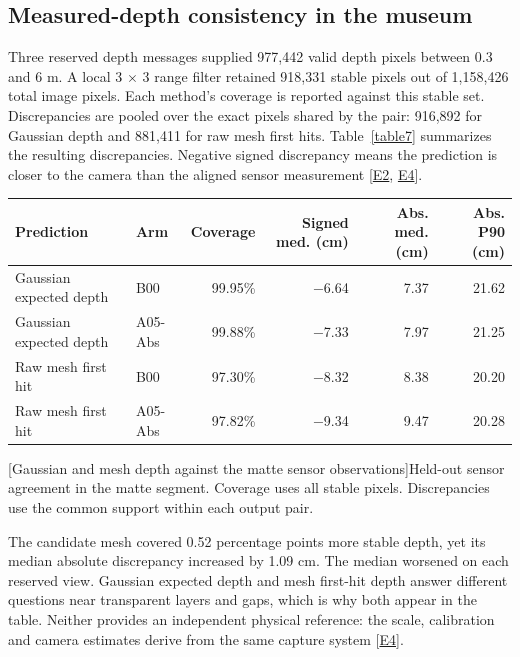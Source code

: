 \documentclass[11pt,a4paper]{article}
\begin{document}
\subsection{Measured-depth consistency in the museum}
Three reserved depth messages supplied 977,442 valid depth pixels between 0.3 and 6 m. A local 3 \ensuremath{\times} 3 range filter retained 918,331 stable pixels out of 1,158,426 total image pixels. Each method's coverage is reported against this stable set. Discrepancies are pooled over the exact pixels shared by the pair: 916,892 for Gaussian depth and 881,411 for raw mesh first hits. Table~\ref{table7} summarizes the resulting discrepancies. Negative signed discrepancy means the prediction is closer to the camera than the aligned sensor measurement [\hyperlink{evE2}{E2}, \hyperlink{evE4}{E4}].\par
\begin{center}\begin{minipage}{\linewidth}
\centering\small\setlength{\tabcolsep}{4pt}
\begin{tabular*}{\linewidth}{@{\extracolsep{\fill}}llrrrr@{}}
\toprule
\textbf{Prediction} & \textbf{Arm} & \textbf{Coverage} & \textbf{Signed med. (cm)} & \textbf{Abs. med. (cm)} & \textbf{Abs. P90 (cm)} \\
\midrule
Gaussian expected depth & B00 & 99.95\% & \ensuremath{-}6.64 & 7.37 & 21.62 \\
Gaussian expected depth & A05-Abs & 99.88\% & \ensuremath{-}7.33 & 7.97 & 21.25 \\
Raw mesh first hit & B00 & 97.30\% & \ensuremath{-}8.32 & 8.38 & 20.20 \\
Raw mesh first hit & A05-Abs & 97.82\% & \ensuremath{-}9.34 & 9.47 & 20.28 \\
\bottomrule
\end{tabular*}\par
{}[Gaussian and mesh depth against the matte sensor observations]{Held-out sensor agreement in the matte segment. Coverage uses all stable pixels. Discrepancies use the common support within each output pair.}\label{table7}
\end{minipage}\end{center}
The candidate mesh covered 0.52 percentage points more stable depth, yet its median absolute discrepancy increased by 1.09 cm. The median worsened on each reserved view. Gaussian expected depth and mesh first-hit depth answer different questions near transparent layers and gaps, which is why both appear in the table. Neither provides an independent physical reference: the scale, calibration and camera estimates derive from the same capture system [\hyperlink{evE4}{E4}].\par
\end{document}
